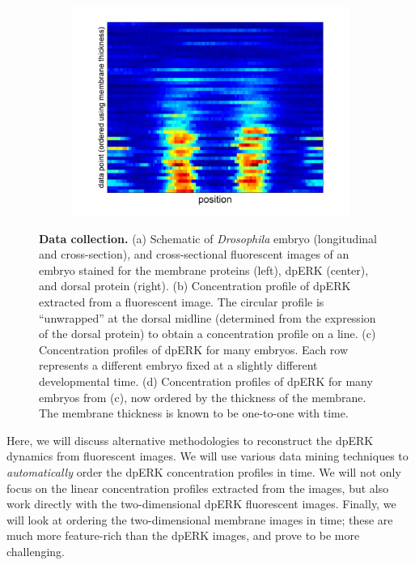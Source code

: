 \documentclass[10pt]{article}
\begin{document}
\begin{figure}[H]
\begin{center}
\begin{subfigure}{0.4\textwidth}
\includegraphics[width=\textwidth]{data_ordered_membrane}
\caption{}
\end{subfigure}
\end{center}
\caption{{\bf Data collection.} (a) Schematic of {\em Drosophila} embryo (longitudinal and cross-section), and cross-sectional fluorescent images of an embryo stained for the membrane proteins (left), dpERK (center), and dorsal protein (right).
(b) Concentration profile of dpERK extracted from a fluorescent image. The circular profile is ``unwrapped'' at the dorsal midline (determined from the expression of the dorsal protein) to obtain a concentration profile on a line.
(c) Concentration profiles of dpERK for many embryos. Each row represents a different embryo fixed at a slightly different developmental time.
(d) Concentration profiles of dpERK for many embryos from (c), now ordered by the thickness of the membrane. The membrane thickness is known to be one-to-one with time.}
\label{fig:background}
\end{figure}

Here,  we will discuss alternative methodologies to reconstruct the dpERK dynamics from fluorescent images. 
%
We will use various data mining techniques to {\em automatically} order the dpERK concentration profiles in time.
%
We will not only focus on the linear concentration profiles extracted from the images, but also work directly with the two-dimensional dpERK fluorescent images. 
%
Finally, we will look at ordering the two-dimensional membrane images in time; these are much more feature-rich than the dpERK images, and prove to be more challenging.
\end{document}
